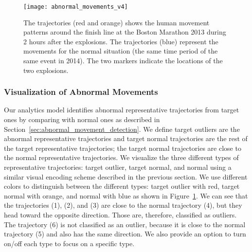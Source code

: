 \begin{figure}[hbt]
	\centering
	\texttt{[image: abnormal\_movements\_v4]}
	\caption{
	The trajectories (red and orange) shows the human movement patterns around the finish line at the Boston Marathon 2013 during 2 hours after the explosions.
	The trajectories (blue) represent the movements for the normal situation (the same time period of the same event in 2014).
	The two markers indicate the locations of the two explosions.
	}
	\label{fig:abnormal_movements}
\end{figure}

\subsubsection{Visualization of Abnormal Movements}
\label{sec:visualization_abnormal}
Our analytics model identifies abnormal representative trajectories from target ones by comparing with normal ones as described in Section~\ref{sec:abnormal_movement_detection}.
We define target outliers are the abnormal representative trajectories and target normal trajectories are the rest of the target representative trajectories; the target normal trajectories are close to the normal representative trajectories.
We visualize the three different types of representative trajectories: target outlier, target normal, and normal using a similar visual encoding scheme described in the previous section.
We use different colors to distinguish between the different types: target outlier with red, target normal with orange, and normal with blue as shown in Figure~\ref{fig:abnormal_movements}.
We can see that the trajectories (1), (2), and (3) are close to the normal trajectory (4), but they head toward the opposite direction.
Those are, therefore, classified as outliers.
The trajectory (6) is not classified as an outlier, because it is close to the normal trajectory (5) and also has the same direction.
We also provide an option to turn on/off each type to focus on a specific type.




